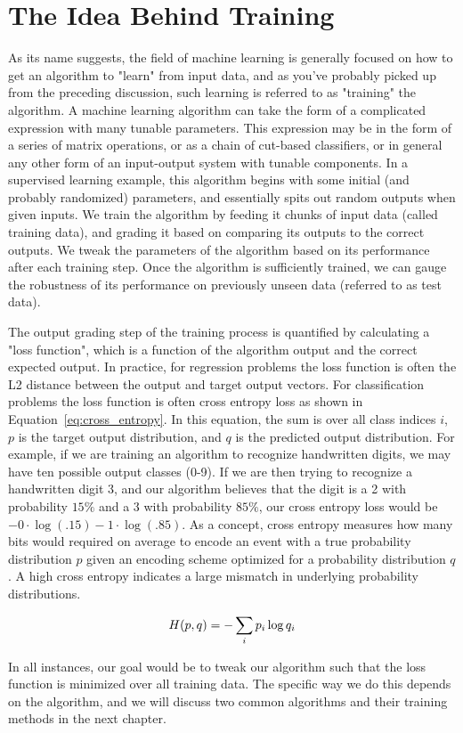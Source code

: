 \section{The Idea Behind Training}

As its name suggests, the field of machine learning is generally focused on how to get an algorithm to "learn" from input data, and as you've probably picked up from the preceding discussion, such learning is referred to as "training" the algorithm. A machine learning algorithm can take the form of a complicated expression with many tunable parameters. This expression may be in the form of a series of matrix operations, or as a chain of cut-based classifiers, or in general any other form of an input-output system with tunable components. In a supervised learning example, this algorithm begins with some initial (and probably randomized) parameters, and essentially spits out random outputs when given inputs. We train the algorithm by feeding it chunks of input data (called training data), and grading it based on comparing its outputs to the correct outputs. We tweak the parameters of the algorithm based on its performance after each training step. Once the algorithm is sufficiently trained, we can gauge the robustness of its performance on previously unseen data (referred to as test data).

The output grading step of the training process is quantified by calculating a "loss function", which is a function of the algorithm output and the correct expected output. In practice, for regression problems the loss function is often the L2 distance between the output and target output vectors. For classification problems the loss function is often cross entropy loss as shown in Equation~\ref{eq:cross_entropy}. In this equation, the sum is over all class indices $i$, $p$ is the target output distribution, and $q$ is the predicted output distribution. For example, if we are training an algorithm to recognize handwritten digits, we may have ten possible output classes (0-9). If we are then trying to recognize a handwritten digit 3, and our algorithm believes that the digit is a 2 with probability $15\%$ and a 3 with probability $85\%$, our cross entropy loss would be $-0\cdot\log(.15)-1\cdot\log(.85)$. As a concept, cross entropy measures how many bits would required on average to encode an event with a true probability distribution $p$ given an encoding scheme optimized for a probability distribution $q$. A high cross entropy indicates a large mismatch in underlying probability distributions.

\begin{equation}
\centering
H(p,q) = -\sum_{i} p_i \log q_i
\label{eq:cross_entropy}
\end{equation}

In all instances, our goal would be to tweak our algorithm such that the loss function is minimized over all training data. The specific way we do this depends on the algorithm, and we will discuss two common algorithms and their training methods in the next chapter.